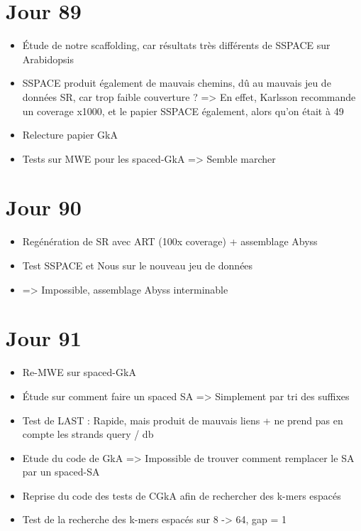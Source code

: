 \documentclass[12pt]{report}
\begin{document}
\section{Jour 89}

\begin{itemize}
	\item Étude de notre scaffolding, car résultats très différents de SSPACE sur Arabidopsis
	
	\item SSPACE produit également de mauvais chemins, dû au mauvais jeu de données SR, car trop faible couverture ?
		  => En effet, Karlsson recommande un coverage x1000, et le papier SSPACE également, alors qu'on était à 49
	
	\item Relecture papier GkA
	
	\item Tests sur MWE pour les spaced-GkA => Semble marcher
\end{itemize}

\section{Jour 90}

\begin{itemize}
	\item Regénération de SR avec ART (100x coverage) + assemblage Abyss
	
	\item Test SSPACE et Nous sur le nouveau jeu de données
	
	\item => Impossible, assemblage Abyss interminable
\end{itemize}

\section{Jour 91}

\begin{itemize}
	\item Re-MWE sur spaced-GkA 
	
	\item Étude sur comment faire un spaced SA => Simplement par tri des suffixes
	
	\item Test de LAST : Rapide, mais produit de mauvais liens + ne prend pas en compte les strands query / db
	
	\item Etude du code de GkA => Impossible de trouver comment remplacer le SA par un spaced-SA
	
	\item Reprise du code des tests de CGkA afin de rechercher des k-mers espacés
	
	\item Test de la recherche des k-mers espacés sur 8 -> 64, gap = 1
\end{itemize}
\end{document}
